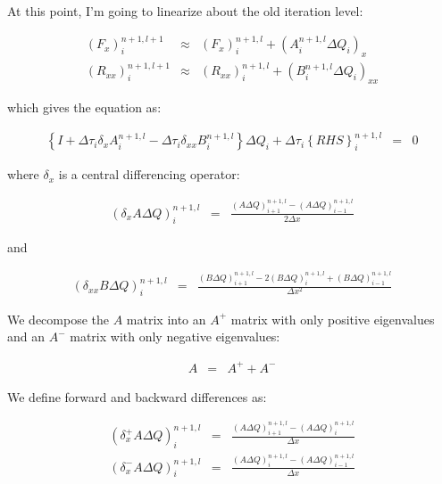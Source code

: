 At this point, I'm going to linearize about the old iteration level:

\begin{eqnarray}
\left(F_x \right)_i^{n+1,l+1}  
&\approx&
\left(F_x \right)_i^{n+1,l}  
+
\left(A^{n+1,l}_i \Delta Q_i \right)_x
\nonumber
\\
\left(R_{xx} \right)_i^{n+1,l+1}  
&\approx&
\left(R_{xx} \right)_i^{n+1,l}  
+
\left(B^{n+1,l}_i \Delta Q_i \right)_{xx}
\nonumber
\end{eqnarray}

which gives the equation as:

\begin{eqnarray}
\left\{ I + \Delta \tau_i \delta_x A_i^{n+1,l} 
- \Delta \tau_i \delta_{xx} B_i^{n+1,l} 
\right\} \Delta Q_i + \Delta \tau_i \left\{RHS \right\}_i^{n+1,l} &=& 0
\nonumber
\end{eqnarray}

where $\delta_x$ is a central differencing operator:

\begin{eqnarray}
\left(\delta_x A \Delta Q \right)_i^{n+1,l} &=&
\frac{
\left(A \Delta Q \right)_{i+1}^{n+1,l}
-\left(A \Delta Q \right)_{i-1}^{n+1,l}
}{ 2 \Delta x}
\nonumber
\end{eqnarray}

and

\begin{eqnarray}
\left(\delta_{xx} B \Delta Q \right)_i^{n+1,l} &=&
\frac{
\left(B \Delta Q \right)_{i+1}^{n+1,l}
-2 \left(B \Delta Q \right)_{i}^{n+1,l}
+\left(B \Delta Q \right)_{i-1}^{n+1,l}
}{ \Delta x^2}
\nonumber
\end{eqnarray}

We decompose the $A$ matrix into an $A^+$ matrix with only positive eigenvalues and
an $A^-$ matrix with only negative eigenvalues:

\begin{eqnarray}
A &=& A^+ + A^-
\nonumber
\end{eqnarray}

We define forward and backward differences as:

\begin{eqnarray}
\left(
\delta_x^+ A \Delta Q \right)_i^{n+1,l} &=&
\frac{
\left(A \Delta Q \right)_{i+1}^{n+1,l}
-\left(A \Delta Q \right)_{i}^{n+1,l}
}{ \Delta x}
\nonumber
\\
\left(
\delta_x^- A \Delta Q \right)_i^{n+1,l}&=&
\frac{
\left(A \Delta Q \right)_{i}^{n+1,l}
-\left(A \Delta Q \right)_{i-1}^{n+1,l}
}{ \Delta x}
\nonumber
\end{eqnarray}

